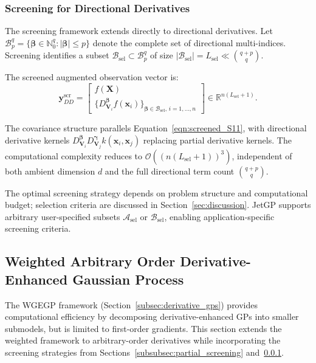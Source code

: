 \documentclass[12pt]{article}
\begin{document}
\subsubsection{Screening for Directional Derivatives}
\label{subsubsec:directional_screening}

The screening framework extends directly to directional derivatives. Let $\mathcal{B}_p^q = \{\boldsymbol{\beta} \in \mathbb{N}_0^q : |\boldsymbol{\beta}| \leq p\}$ denote the complete set of directional multi-indices. Screening identifies a subset $\mathcal{B}_{\text{sel}} \subset \mathcal{B}_p^q$ of size $|\mathcal{B}_{\text{sel}}| = L_{\text{sel}} \ll \binom{q+p}{q}$.

The screened augmented observation vector is:
\begin{equation}
	\label{eqn:screened_dd_aug_vector}
	\mathbf{y}_{DD}^{\text{scr}} = 
	\begin{bmatrix} 
		f(\mathbf{X}) \\
		\{D_{\mathbf{V}_i}^{\boldsymbol{\beta}} f(\mathbf{x}_i)\}_{\boldsymbol{\beta} \in \mathcal{B}_{\text{sel}}, \, i=1,\ldots,n}
	\end{bmatrix} \in \mathbb{R}^{n(L_{\text{sel}} + 1)}.
\end{equation}

The covariance structure parallels Equation~\eqref{eqn:screened_S11}, with directional derivative kernels $D_{\mathbf{V}_i}^{\boldsymbol{\beta}} D_{\mathbf{V}_j}^{\boldsymbol{\gamma}} k(\mathbf{x}_i, \mathbf{x}_j)$ replacing partial derivative kernels. The computational complexity reduces to $\mathcal{O}((n(L_{\text{sel}} + 1))^3)$, independent of both ambient dimension $d$ and the full directional term count $\binom{q+p}{q}$.

The optimal screening strategy depends on problem structure and computational budget; selection criteria are discussed in Section~\ref{sec:discussion}. JetGP supports arbitrary user-specified subsets $\mathcal{A}_{\text{sel}}$ or $\mathcal{B}_{\text{sel}}$, enabling application-specific screening criteria.

\subsection{Weighted Arbitrary Order Derivative-Enhanced Gaussian Process}
\label{subsec:wdegp}

The WGEGP framework (Section~\ref{subsec:derivative_gps}) provides computational efficiency by decomposing derivative-enhanced GPs into smaller submodels, but is limited to first-order gradients. This section extends the weighted framework to arbitrary-order derivatives while incorporating the screening strategies from Sections~\ref{subsubsec:partial_screening} and~\ref{subsubsec:directional_screening}.
\end{document}
